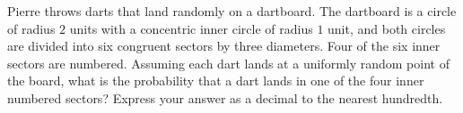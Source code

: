 Pierre throws darts that land randomly on a dartboard. The dartboard is a circle of radius $2$ units with a concentric inner circle of radius $1$ unit, and both circles are divided into six congruent sectors by three diameters. Four of the six inner sectors are numbered. Assuming each dart lands at a uniformly random point of the board, what is the probability that a dart lands in one of the four inner numbered sectors? Express your answer as a decimal to the nearest hundredth.
